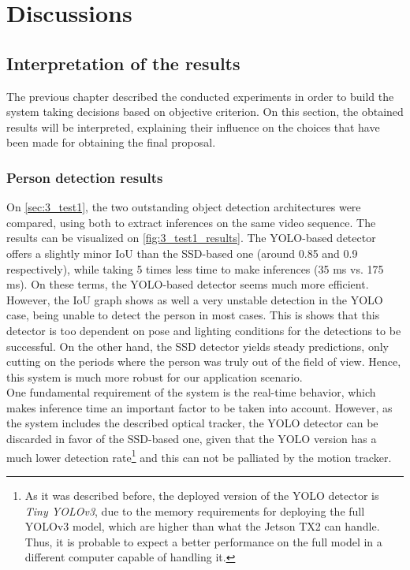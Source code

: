 \chapter{Discussions}


\section{Interpretation of the results}
The previous chapter described the conducted experiments in order to build the system taking decisions based on objective criterion. On this section, the obtained results will be interpreted, explaining their influence on the choices that have been made for obtaining the final proposal.\\

\subsection{Person detection results}

On \autoref{sec:3_test1}, the two outstanding object detection architectures were compared, using both to extract inferences on the same video sequence. The results can be visualized on \autoref{fig:3_test1_results}. The YOLO-based detector offers a slightly minor IoU than the SSD-based one (around 0.85 and 0.9 respectively), while taking 5 times less time to make inferences (35 ms vs. 175 ms). On these terms, the YOLO-based detector seems much more efficient. However, the IoU graph shows as well a very unstable detection in the YOLO case, being unable to detect the person in most cases. This is shows that this detector is too dependent on pose and lighting conditions for the detections to be successful. On the other hand, the SSD detector yields steady predictions, only cutting on the periods where the person was truly out of the field of view. Hence, this system is much more robust for our application scenario.\\

One fundamental requirement of the system is the real-time behavior, which makes inference time an important factor to be taken into account. However, as the system includes the described optical tracker, the YOLO detector can be discarded in favor of the SSD-based one, given that the YOLO version has a much lower detection rate\footnote{As it was described before, the deployed version of the YOLO detector is \textit{Tiny YOLOv3}, due to the memory requirements for deploying the full YOLOv3 model, which are higher than what the Jetson TX2 can handle. Thus, it is probable to expect a better performance on the full model in a different computer capable of handling it.} and this can not be palliated by the motion tracker.\\

